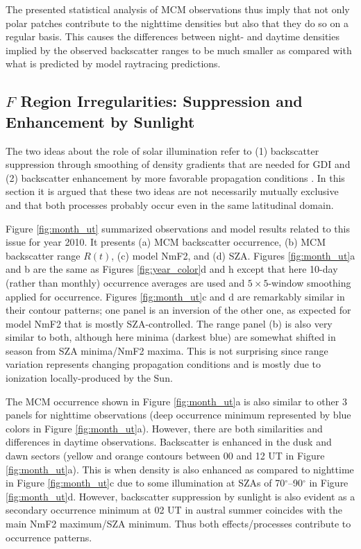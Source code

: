 The presented statistical analysis of MCM observations thus imply that not only polar patches contribute to the nighttime densities but also that they do so on a regular basis. This causes the differences between night- and daytime densities implied by the observed backscatter ranges to be much smaller as compared with what is predicted by model raytracing predictions.


\subsection{\(F\) Region Irregularities: Suppression and Enhancement by Sunlight}

The two ideas about the role of solar illumination refer to (1) backscatter suppression through smoothing of density gradients that are needed for GDI \citep{Ruohoniemi1997,Koustov2004} and (2) backscatter enhancement by more favorable propagation conditions \citep{Bristow2011,Koustov2014}. In this section it is argued that these two ideas are not necessarily mutually exclusive and that both processes probably occur even in the same latitudinal domain.

Figure \ref{fig:month_ut} summarized observations and model results related to this issue for year 2010. It presents (a) MCM backscatter occurrence, (b) MCM backscatter range \(R(t)\), (c) model NmF2, and (d) SZA. Figures \ref{fig:month_ut}a and b are the same as Figures \ref{fig:year_color}d and h except that here 10-day (rather than monthly) occurrence averages are used and \(5\times5\)-window smoothing applied for occurrence. Figures \ref{fig:month_ut}c and d are remarkably similar in their contour patterns; one panel is an inversion of the other one, as expected for model NmF2 that is mostly SZA-controlled. The range panel (b) is also very similar to both, although here minima (darkest blue) are somewhat shifted in season from SZA minima/NmF2 maxima. This is not surprising since range variation represents changing propagation conditions and is mostly due to ionization locally-produced by the Sun.

The MCM occurrence shown in Figure \ref{fig:month_ut}a is also similar to other 3 panels for nighttime observations (deep occurrence minimum represented by blue colors in Figure \ref{fig:month_ut}a). However, there are both similarities and differences in daytime observations. Backscatter is enhanced in the dusk and dawn sectors (yellow and orange contours between 00 and 12 UT in Figure \ref{fig:month_ut}a). This is when density is also enhanced as compared to nighttime in Figure \ref{fig:month_ut}c due to some illumination at SZAs of 70$^\circ$--90$^\circ$ in Figure \ref{fig:month_ut}d. However, backscatter suppression by sunlight is also evident as a secondary occurrence minimum at 02 UT in austral summer coincides with the main NmF2 maximum/SZA minimum. Thus both effects/processes contribute to occurrence patterns.

